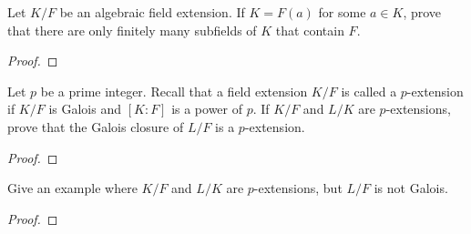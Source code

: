 \begin{problem}
Let $K/F$ be an algebraic field extension. If $K=F(a)$ for some $a\in K$,
prove that there are only finitely many subfields of $K$ that contain $F$.
\end{problem}
\begin{proof}
\end{proof}

\begin{problem}
Let $p$ be a prime integer. Recall that a field extension $K/F$ is called a
$p$-extension if $K/F$ is Galois and $[K:F]$ is a power of $p$. If $K/F$
and $L/K$ are $p$-extensions, prove that the Galois closure of $L/F$ is a
$p$-extension.
\end{problem}
\begin{proof}
\end{proof}

\begin{problem}
Give an example where $K/F$ and $L/K$ are $p$-extensions, but $L/F$ is not
Galois.
\end{problem}
\begin{proof}
\end{proof}

